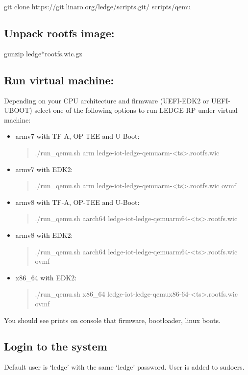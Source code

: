 \documentclass[a4paper,10pt,oneside,english]{sphinxmanual}
\begin{document}
\begin{sphinxVerbatim}[commandchars=\\\{\}]
git clone https://git.linaro.org/ledge/scripts.git/
 scripts/qemu
\end{sphinxVerbatim}


\subsection{Unpack rootfs image:}
\label{\detokenize{user-guide:unpack-rootfs-image}}
\begin{sphinxVerbatim}[commandchars=\\\{\}]
gunzip ledge\PYGZhy{}*rootfs.wic.gz
\end{sphinxVerbatim}


\subsection{Run virtual machine:}
\label{\detokenize{user-guide:run-virtual-machine}}
Depending on your CPU architecture and firmware (UEFI-EDK2 or UEFI-UBOOT)
select one of the following options to run LEDGE RP under virtual machine:
\begin{itemize}
\item {} 
armv7 with TF-A, OP-TEE and U-Boot:
\begin{quote}

./run\_qemu.sh arm ledge-iot-ledge-qemuarm-\textless{}ts\textgreater{}.rootfs.wic
\end{quote}

\item {} 
armv7 with EDK2:
\begin{quote}

./run\_qemu.sh arm ledge-iot-ledge-qemuarm-\textless{}ts\textgreater{}.rootfs.wic ovmf
\end{quote}

\item {} 
armv8 with TF-A, OP-TEE and U-Boot:
\begin{quote}

./run\_qemu.sh aarch64 ledge-iot-ledge-qemuarm64-\textless{}ts\textgreater{}.rootfs.wic
\end{quote}

\item {} 
armv8 with EDK2:
\begin{quote}

./run\_qemu.sh aarch64 ledge-iot-ledge-qemuarm64-\textless{}ts\textgreater{}.rootfs.wic ovmf
\end{quote}

\item {} 
x86\_64 with EDK2:
\begin{quote}

./run\_qemu.sh x86\_64 ledge-iot-ledge-qemux86-64-\textless{}ts\textgreater{}.rootfs.wic ovmf
\end{quote}

\end{itemize}

You should see prints on console that firmware, bootloader, linux boots.


\subsection{Login to the system}
\label{\detokenize{user-guide:login-to-the-system}}
Default user is ‘ledge’ with the same ‘ledge’ password. User is added to
sudoers.



\renewcommand{\indexname}{Index}
\printindex
\end{document}
